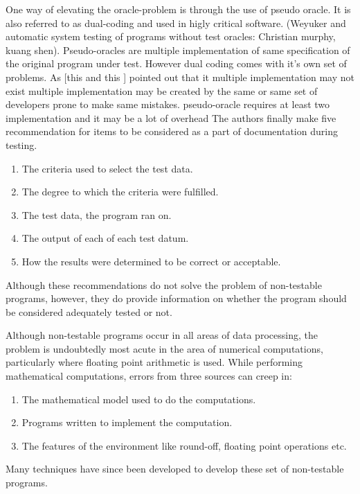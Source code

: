 One way of elevating the oracle-problem is through the use of pseudo oracle. It is also referred to as dual-coding and used in higly critical software. (Weyuker and automatic system testing of programs without test oracles: Christian murphy, kuang shen). Pseudo-oracles are multiple implementation of same specification of the original program under test.
 However dual coding comes with it's own set of problems. As [this and this ] pointed out that it 
 multiple implementation may not exist
 multiple implementation may be created by the same or same set of developers prone to make same mistakes.
 pseudo-oracle requires at least two implementation and it may be a lot of overhead 
 The authors finally make five recommendation for items to be considered as a part of documentation during testing.
\begin{enumerate}
  \item The criteria used to select the test data.
  \item The degree to which the criteria were fulfilled.
  \item The test data, the program ran on.
  \item The output of each of each test datum.
  \item How the results were determined to be correct or acceptable.
\end{enumerate}
Although these recommendations do not solve the problem of non-testable programs, however, they do provide information on whether the program should be considered adequately tested or not.

 
 Although non-testable programs occur in all areas of data processing, the problem is undoubtedly most acute in the area of numerical computations, particularly where floating point arithmetic is used. While performing mathematical computations, errors from three sources can creep in:
\begin{enumerate}
  \item The mathematical model used to do the computations.
  \item Programs written to implement the computation.
  \item The features of the environment like round-off, floating point operations etc.
\end{enumerate}

Many techniques have since been developed to develop these set of non-testable programs.


